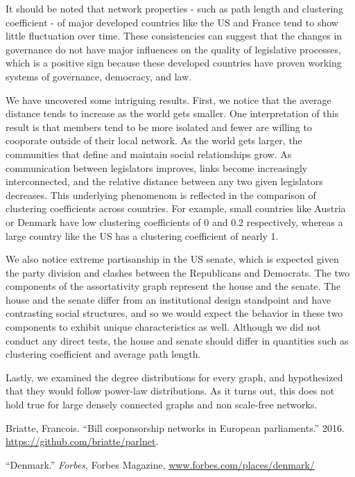 \documentclass[12pt]{article}
\begin{document}
\begin{multicols*}{2}
It should be noted that network properties - such as path length and clustering coefficient - of major developed countries like the US and France tend to show little fluctuation over time. These consistencies can suggest that the changes in governance do not have major influences on the quality of legislative processes, which is a positive sign because these developed countries have proven working systems of governance, democracy, and law. 

We have uncovered some intriguing results. First, we notice that the average distance tends to increase as the world gets smaller. One interpretation of this result is that members tend to be more isolated and fewer are willing to cooporate outside of their local network. As the world gets larger, the communities that define and maintain social relationships grow. As communication between legislators improves, links become increasingly interconnected, and the relative distance between any two given legislators decreases. This underlying phenomenom is reflected in the comparison of clustering coefficients across countries. For example, small countries like Austria or Denmark have low clustering coefficients of 0 and 0.2 respectively, whereas a large country like the US has a clustering coefficient of nearly 1. 

We also notice extreme partisanship in the US senate, which is expected given the party division and clashes between the Republicans and Democrats. The two components of the assortativity graph represent the house and the senate. The house and the senate differ from an institutional design standpoint and have contrasting social structures, and so we would expect the behavior in these two components to exhibit unique characteristics as well. Although we did not conduct any direct tests, the house and senate should differ in quantities such as clustering coefficient and average path length. 

Lastly, we examined the degree distributions for every graph, and hypothesized that they would follow power-law distributions. As it turns out, this does not hold true for large densely connected graphs and non scale-free networks.

\begin{thebibliography}{9}

 Briatte, Francois. ``Bill cosponsorship networks in European parliaments.'' 2016. \url{https://github.com/briatte/parlnet}.

 ``Denmark.'' \emph{Forbes}, Forbes Magazine, \url{www.forbes.com/places/denmark/}


\end{thebibliography}
\end{multicols*}
\end{document}

